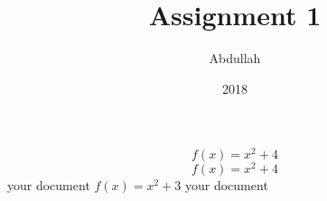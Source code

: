 \documentclass{article}
\title{Assignment 1}
\author{Abdullah}
\date{2018}
\begin{document}
	\maketitle
	\newpage
	\begin{equation}
	f(x)=x^2+4
	\end{equation}
	\begin{equation*}
	f(x)=x^2+4
	\end{equation*}
	 your document $f(x)=x^2+3$ your document
\end{document}
